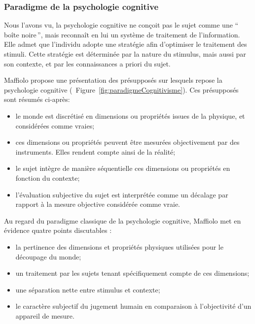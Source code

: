 \subsubsection{Paradigme de la psychologie cognitive}
\label{sec:ch3_psychoCog}

Nous l'avons vu, la psychologie cognitive ne conçoit pas le sujet comme une ``\,boîte noire\,'', mais reconnaît en lui un système de traitement de l'information. Elle admet que l'individu adopte une stratégie afin d'optimiser le traitement des stimuli. Cette stratégie est déterminée par la nature du stimulus, mais aussi par son contexte, et par les connaissances a priori du sujet.

Maffiolo \citep[p. ??]{maffiolo_caracterisation_1999} propose une présentation des présupposés sur lesquels repose la psychologie cognitive (\cf~Figure~\ref{fig:paradigmeCognitivisme}). Ces présupposés sont résumés ci-après:

\begin{itemize}
\item le monde est discrétisé en dimensions ou propriétés issues de la physique, et considérées comme vraies;
\item ces dimensions ou propriétés peuvent être mesurées objectivement par des instruments. Elles rendent compte ainsi de la réalité;
\item le sujet intègre de manière séquentielle ces dimensions ou propriétés en fonction du contexte;
\item l'évaluation subjective du sujet est interprétée comme un décalage par rapport à la mesure objective considérée comme vraie.
\end{itemize}

Au regard du paradigme classique de la psychologie cognitive, Maffiolo met en évidence quatre points discutables :

\begin{itemize}
\item la pertinence des dimensions et propriétés physiques utilisées pour le découpage du monde;
\item un traitement par les sujets tenant spécifiquement compte de ces dimensions;
\item une séparation nette entre stimulus et contexte;
\item le caractère subjectif du jugement humain en comparaison à l'objectivité d'un appareil de mesure.
\end{itemize}

 \\

